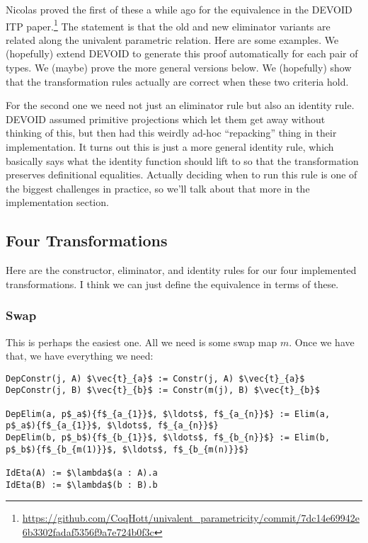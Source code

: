 Nicolas proved the first of these a while ago
for the equivalence in the DEVOID ITP paper.\footnote{\url{https://github.com/CoqHott/univalent_parametricity/commit/7dc14e69942e6b3302fadaf5356f9a7e724b0f3c}}
The statement is that the old and new eliminator variants are related along the univalent parametric relation.
Here are some examples.
We (hopefully) extend DEVOID to generate this proof automatically for each pair of types.
We (maybe) prove the more general versions below. 
We (hopefully) show that the transformation rules actually are correct when these two criteria hold.

For the second one we need not just an eliminator rule but also an identity rule.
DEVOID assumed primitive projections which let them get away without thinking of this,
but then had this weirdly ad-hoc ``repacking'' thing in their implementation.
It turns out this is just a more general identity rule, which basically says what
the identity function should lift to so that the transformation preserves definitional equalities.
Actually deciding when to run this rule is one of the biggest challenges in practice,
so we'll talk about that more in the implementation section.

\subsection{Four Transformations}

Here are the constructor, eliminator, and identity rules for our four implemented transformations.
I think we can just define the equivalence in terms of these.

\subsubsection{Swap}

This is perhaps the easiest one. All we need is some swap map $m$. Once we have that, we have everything we need:

\begin{lstlisting}
DepConstr(j, A) $\vec{t}_{a}$ := Constr(j, A) $\vec{t}_{a}$
DepConstr(j, B) $\vec{t}_{b}$ := Constr(m(j), B) $\vec{t}_{b}$

DepElim(a, p$_a$){f$_{a_{1}}$, $\ldots$, f$_{a_{n}}$} := Elim(a, p$_a$){f$_{a_{1}}$, $\ldots$, f$_{a_{n}}$}
DepElim(b, p$_b$){f$_{b_{1}}$, $\ldots$, f$_{b_{n}}$} := Elim(b, p$_b$){f$_{b_{m(1)}}$, $\ldots$, f$_{b_{m(n)}}$}

IdEta(A) := $\lambda$(a : A).a
IdEta(B) := $\lambda$(b : B).b
\end{lstlisting}

